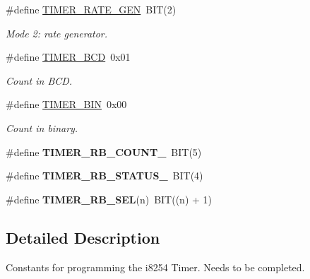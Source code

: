 \begin{DoxyCompactItemize}
\mbox{\label{group__i8254_ga5d4449e0fa1cf4a4d107a48a04a1265f}} 
\#define \hyperlink{group__i8254_ga5d4449e0fa1cf4a4d107a48a04a1265f}{T\+I\+M\+E\+R\+\_\+\+R\+A\+T\+E\+\_\+\+G\+EN}~B\+IT(2)
\begin{DoxyCompactList}\small\item\em Mode 2\+: rate generator. \end{DoxyCompactList}\item 
\mbox{\label{group__i8254_ga325b992a371d5d981c4eceff42fa5956}} 
\#define \hyperlink{group__i8254_ga325b992a371d5d981c4eceff42fa5956}{T\+I\+M\+E\+R\+\_\+\+B\+CD}~0x01
\begin{DoxyCompactList}\small\item\em Count in B\+CD. \end{DoxyCompactList}\item 
\mbox{\label{group__i8254_gad2913dcf2f91453317bd035589ac0a7d}} 
\#define \hyperlink{group__i8254_gad2913dcf2f91453317bd035589ac0a7d}{T\+I\+M\+E\+R\+\_\+\+B\+IN}~0x00
\begin{DoxyCompactList}\small\item\em Count in binary. \end{DoxyCompactList}\item 
\mbox{\label{group__i8254_ga6c248216df24b5e9d907d126d80bd195}} 
\#define {\bfseries T\+I\+M\+E\+R\+\_\+\+R\+B\+\_\+\+C\+O\+U\+N\+T\+\_\+}~B\+IT(5)
\item 
\mbox{\label{group__i8254_ga08b4952bb7058684a3f8f66be04dd45e}} 
\#define {\bfseries T\+I\+M\+E\+R\+\_\+\+R\+B\+\_\+\+S\+T\+A\+T\+U\+S\+\_\+}~B\+IT(4)
\item 
\mbox{\label{group__i8254_gaf598b17740e07842a0545af512714711}} 
\#define {\bfseries T\+I\+M\+E\+R\+\_\+\+R\+B\+\_\+\+S\+EL}(n)~B\+IT((n) + 1)
\end{DoxyCompactItemize}


\subsection{Detailed Description}
Constants for programming the i8254 Timer. Needs to be completed. 